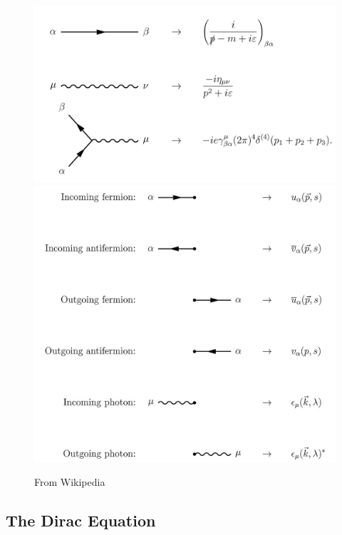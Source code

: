 \documentclass{book}
\theoremstyle{definition}
\begin{document}
\begin{figure}[!htb]
	\centering
	\includegraphics[scale=0.1]{QED}
	\includegraphics[scale=2]{QED-1}
	\caption{From Wikipedia}
\end{figure}











\newpage


\subsection{The Dirac Equation}
\end{document}

